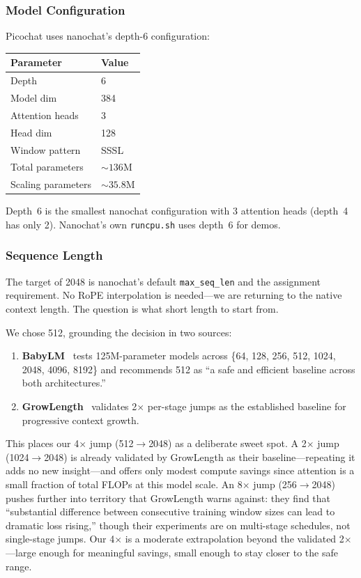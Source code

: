 \documentclass[11pt]{article}
\begin{document}
\subsubsection{Model Configuration}

Picochat uses nanochat's depth-6 configuration:

\begin{table}[H]
\centering\small
\begin{tabular}{@{}ll@{}}
\toprule
Parameter & Value \\
\midrule
Depth & 6 \\
Model dim & 384 \\
Attention heads & 3 \\
Head dim & 128 \\
Window pattern & SSSL \\
Total parameters & ${\sim}136$M \\
Scaling parameters & ${\sim}35.8$M \\
\bottomrule
\end{tabular}
\end{table}

Depth~6 is the smallest nanochat configuration with 3 attention heads (depth~4 has only 2). Nanochat's own \texttt{runcpu.sh} uses depth~6 for demos.

\subsubsection{Sequence Length}

The target of 2048 is nanochat's default \texttt{max\_seq\_len} and the assignment requirement. No RoPE interpolation is needed---we are returning to the native context length. The question is what short length to start from.

We chose 512, grounding the decision in two sources:

\begin{enumerate}
  \item \textbf{BabyLM}~\cite{babyslen} tests 125M-parameter models across \{64, 128, 256, 512, 1024, 2048, 4096, 8192\} and recommends 512 as ``a safe and efficient baseline across both architectures.''
  \item \textbf{GrowLength}~\cite{growlength} validates 2$\times$ per-stage jumps as the established baseline for progressive context growth.
\end{enumerate}

This places our 4$\times$ jump (512$\to$2048) as a deliberate sweet spot. A 2$\times$ jump (1024$\to$2048) is already validated by GrowLength as their baseline---repeating it adds no new insight---and offers only modest compute savings since attention is a small fraction of total FLOPs at this model scale. An 8$\times$ jump (256$\to$2048) pushes further into territory that GrowLength warns against: they find that ``substantial difference between consecutive training window sizes can lead to dramatic loss rising,'' though their experiments are on multi-stage schedules, not single-stage jumps. Our 4$\times$ is a moderate extrapolation beyond the validated 2$\times$---large enough for meaningful savings, small enough to stay closer to the safe range.
\end{document}
